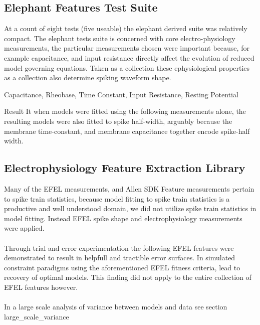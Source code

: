 \subsection{Elephant Features Test Suite}
At a count of eight tests (five useable) the elephant derived suite was relatively compact. The elephant tests suite is concerned with core electro-physiology measurements, the particular measurements chosen were important because, for example capacitance, and input resistance directly affect the evolution of reduced model governing equations. Taken as a collection these ephysiological properties as a collection also determine spiking waveform shape. 

Capacitance, Rheobase, Time Constant, Input Resistance, Resting Potential

Result It when models were fitted using the following measurements alone, the resulting models were also fitted to spike half-width, arguably because the membrane time-constant, and membrane capacitance together encode spike-half width.

\subsection{Electrophysiology Feature Extraction Library}

Many of the EFEL measurements, and Allen SDK Feature measurements pertain to spike train statistics, because model fitting to spike train statistics is a productive and well understood domain, we did not utilize spike train statistics in model fitting. Instead EFEL spike shape and electrophysiology measurements were applied.\\
\\
Through trial and error experimentation the following EFEL features were demonstrated to result in helpfull and tractible error surfaces. In simulated constraint paradigms using the aforementioned EFEL fitness criteria, lead to recovery of optimal models. This finding did not apply to the entire collection of EFEL features however.\\
\\
In a large scale analysis of variance between models and data see section large\_scale\_variance


